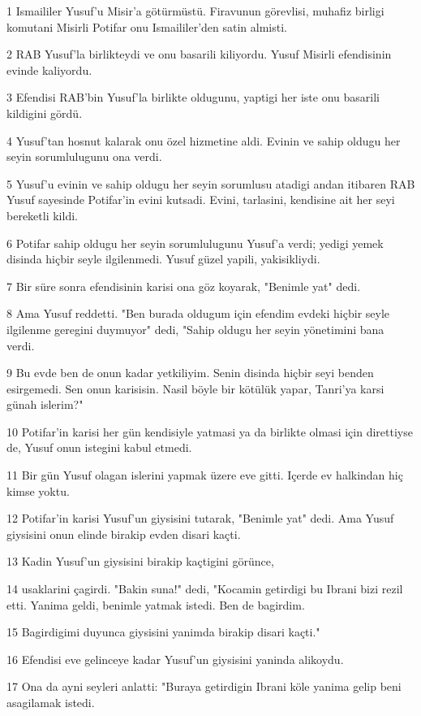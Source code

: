 \par 1 Ismaililer Yusuf'u Misir'a götürmüstü. Firavunun görevlisi, muhafiz birligi komutani Misirli Potifar onu Ismaililer'den satin almisti.
\par 2 RAB Yusuf'la birlikteydi ve onu basarili kiliyordu. Yusuf Misirli efendisinin evinde kaliyordu.
\par 3 Efendisi RAB'bin Yusuf'la birlikte oldugunu, yaptigi her iste onu basarili kildigini gördü.
\par 4 Yusuf'tan hosnut kalarak onu özel hizmetine aldi. Evinin ve sahip oldugu her seyin sorumlulugunu ona verdi.
\par 5 Yusuf'u evinin ve sahip oldugu her seyin sorumlusu atadigi andan itibaren RAB Yusuf sayesinde Potifar'in evini kutsadi. Evini, tarlasini, kendisine ait her seyi bereketli kildi.
\par 6 Potifar sahip oldugu her seyin sorumlulugunu Yusuf'a verdi; yedigi yemek disinda hiçbir seyle ilgilenmedi. Yusuf güzel yapili, yakisikliydi.
\par 7 Bir süre sonra efendisinin karisi ona göz koyarak, "Benimle yat" dedi.
\par 8 Ama Yusuf reddetti. "Ben burada oldugum için efendim evdeki hiçbir seyle ilgilenme geregini duymuyor" dedi, "Sahip oldugu her seyin yönetimini bana verdi.
\par 9 Bu evde ben de onun kadar yetkiliyim. Senin disinda hiçbir seyi benden esirgemedi. Sen onun karisisin. Nasil böyle bir kötülük yapar, Tanri'ya karsi günah islerim?"
\par 10 Potifar'in karisi her gün kendisiyle yatmasi ya da birlikte olmasi için direttiyse de, Yusuf onun istegini kabul etmedi.
\par 11 Bir gün Yusuf olagan islerini yapmak üzere eve gitti. Içerde ev halkindan hiç kimse yoktu.
\par 12 Potifar'in karisi Yusuf'un giysisini tutarak, "Benimle yat" dedi. Ama Yusuf giysisini onun elinde birakip evden disari kaçti.
\par 13 Kadin Yusuf'un giysisini birakip kaçtigini görünce,
\par 14 usaklarini çagirdi. "Bakin suna!" dedi, "Kocamin getirdigi bu Ibrani bizi rezil etti. Yanima geldi, benimle yatmak istedi. Ben de bagirdim.
\par 15 Bagirdigimi duyunca giysisini yanimda birakip disari kaçti."
\par 16 Efendisi eve gelinceye kadar Yusuf'un giysisini yaninda alikoydu.
\par 17 Ona da ayni seyleri anlatti: "Buraya getirdigin Ibrani köle yanima gelip beni asagilamak istedi.
